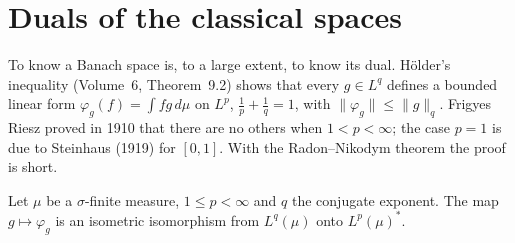 \section{Duals of the classical spaces}

To know a Banach space is, to a large extent, to know its dual. Hölder's inequality (Volume~6, Theorem~9.2) shows that every $g\in L^q$ defines a bounded linear form $\varphi_g(f)=\int fg\,d\mu$ on $L^p$, $\frac1p+\frac1q=1$,
with $\|\varphi_g\|\le\|g\|_q$. Frigyes Riesz proved in 1910 that there are no others when $1<p<\infty$; the case $p=1$ is due to Steinhaus (1919) for $[0,1]$. With the Radon--Nikodym theorem the proof is short.

\begin{theorem}[duality of $L^p$]\label{thm:lpdual}
Let $\mu$ be a $\sigma$-finite measure, $1\le p<\infty$ and $q$ the conjugate exponent. The map $g\mapsto\varphi_g$ is an isometric isomorphism from $L^q(\mu)$ onto $L^p(\mu)^*$.
\end{theorem}
